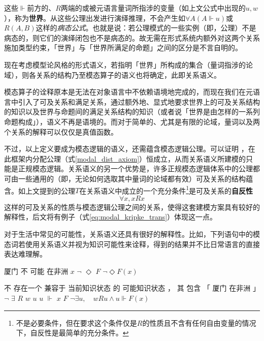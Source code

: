 \documentclass[fontset=ubuntu]{ctexart}
\begin{document}
			这些\(\Vdash\)前方的、\(R\)两端的或被元语言量词所指涉的变量（如上文公式中出现的\(u,w\)），称为\textbf{世界}。从这些公理出发进行演绎推理，不会产生如\(\forall A(A\Vdash u)\)或\(R(A,B)\)这样的\textit{病态公式}。也就是说：若公理模式的一些实例（即，公理）不是病态的，则它们的演绎闭包也不是病态的。故无需在形式系统内额外对这两个关系施加类型约束，「世界」与「世界所满足的命题」之间的区分是不言自明的。

			现在考虑模型论风格的形式语义，若指明「世界」所构成的集合（量词指涉的论域），则各关系的结构乃至模态算子的语义也将确定，此即关系语义。

			模态算子的诠释原本是无法在对象语言中不依赖语境地完成的，而现在我们在元语言中引入了可及关系和满足关系，通过额外地、显式地要求世界上的可及关系结构的知识以及世界与命题间的满足关系结构的知识（或者说「世界是由怎样的一系列命题构成」），语义不再是语境的。而对于简单的、尤其是有限的论域，量词以及两个关系的解释可以仅仅是真值函数。

			不过，以上定义要成为模态逻辑的语义，还需蕴含模态逻辑公理。可以证明%
			，在此框架内分配公理（式\ref{modal_dist_axiom}）恒成立，从而关系语义所建模的只能是正规模态逻辑。关系语义的另一个优势是，许多正规模态逻辑体系中的公理都可由一些通用的（即，无论如何选取其中量词的论域都有效）可及关系的结构蕴含。如上文提到的公理\(T\)在关系语义中成立的一个充分条件\footnote{不是必要条件，但在要求这个条件仅是\(R\)的性质且不含有任何自由变量的情况下，自反性是最简单的充分条件。}是可及关系的\textbf{自反性}
			\begin{equation}
				\forall x, xRx
			\end{equation}
			这样的可及关系的性质与模态逻辑公理之间的关系，使得这套建模方案具有较好的解释性，后文将有例子（式\ref{eq:modal_kripke_trans}）体现这一点。

			对于生活中常见的可能性，关系语义还具有很好的解释性。比如，下列语句中的模态词若使用关系语义并视为知识可能性来诠释，得到的结果并不比日常语言的直接表达难理解。
			
			\begin{covexamples}
				\item 
					\gll 厦门 不 可能 在非洲
						\(x\) \(\lnot\) \(\Diamond\) \(F\)
					\glt \(\lnot\Diamond F(x)\)
					\glend
				\item 
					\gll 不 存在一个 兼容于 当前知识状态 的 可能知识状态 ， 其 包含 「 厦门 在非洲 」
						\(\lnot\) \(\exists\) \(R\) \(w\) {} \(u\) {} \(u\) \(\Vdash\) {} \(x\) \(F\) {}
					\glt \(\lnot\exists u,\quad wRu\land u\Vdash F(x)\)
					\glend
			\end{covexamples}
\end{document}
